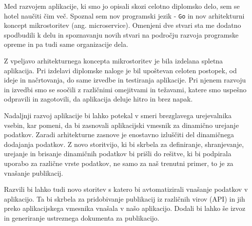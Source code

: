 \documentclass[a4paper, 12pt]{book}
\begin{document}
Med razvojem aplikacije, ki smo jo opisali skozi celotno diplomsko delo, sem se hotel naučiti čim več. Spoznal sem nov programski jezik - \verb=Go= in nov arhitekturni koncept mikrostoritev (ang. microservice). Omenjeni dve stvari sta me dodatno spodbudili k delu in spoznavanju novih stvari na področju razvoja programske opreme in pa tudi same organizacije dela.

Z vpeljavo arhitekturnega koncepta mikrostoritev je bila izdelana spletna aplikacija. Pri izdelavi diplomske naloge je bil upoštevan celoten postopek, od ideje in načrtovanja, do same izvedbe in testiranja aplikacije. Pri njenem razvoju in izvedbi smo se soočili z različnimi omejitvami in težavami, katere smo uspešno odpravili in zagotovili, da aplikacija deluje hitro in brez napak.

Nadaljnji razvoj aplikacije bi lahko potekal v smeri brezglavega urejevalnika vsebin, kar pomeni, da bi zasnovali aplikacijski vmesnik za dinamično urejanje podatkov. Zaradi arhitekturne zasnove je enostavno izluščiti del dinamičnega dodajanja podatkov. Z novo storitvijo, ki bi skrbela za definiranje, shranjevanje, urejanje in brisanje dinamičnih podatkov bi prišli do rešitve, ki bi podpirala uporabo za različne vrste podatkov, ne samo za naš trenutni primer, to je za vnašanje publikacij.

Razvili bi lahko tudi novo storitev s katero bi avtomatizirali vnašanje podatkov v aplikacijo. Ta bi skrbela za pridobivanje publikacij iz različnih virov (API) in jih preko aplikacijskega vmesnika vnašala v našo aplikacijo. Dodali bi lahko še izvoz in generiranje ustreznega dokumenta za publikacijo.

\clearpage
{}


\end{document}
